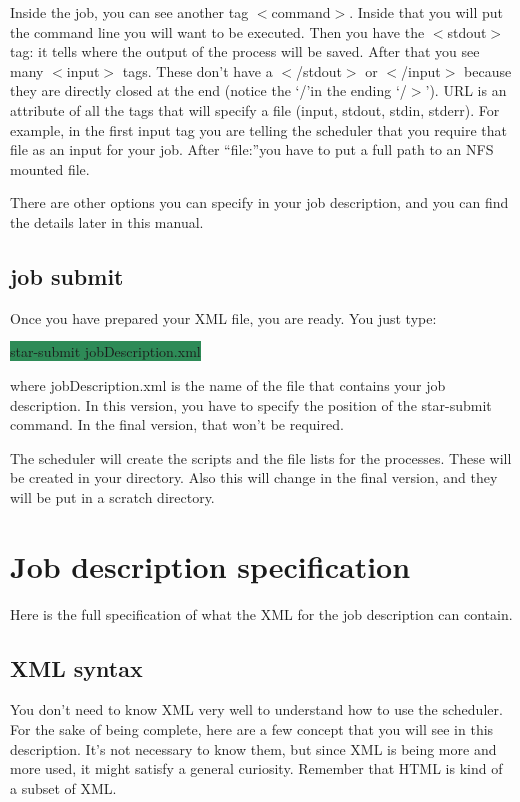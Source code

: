 Inside the job, you can see another tag $<$command$>$.
Inside that you will put the command line you will want to be executed.
Then you have the $<$stdout$>$ tag:
it tells where the output of the process will be saved.
After that you see many $<$input$>$ tags.
These don't have a $<$/stdout$>$ or $<$/input$>$ because they are directly closed at the end (notice the \textquoteleft{/}\textquoteright in the ending \textquoteleft{/}$>$\textquoteright).
URL is an attribute of all the tags that will specify a file (input, stdout, stdin, stderr).
For example,
in the first input tag you are telling the scheduler that you require that file as an input for your job.
After \textquotedblleft{file:}\textquotedblright you have to put a full path to an NFS mounted file.

There are other options you can specify in your job description,
and you can find the details later in this manual.

\subsection{job submit}
Once you have prepared your XML file, you are ready. You just type:
\begin{center}
  \colorbox{seagreen}{star-submit jobDescription.xml}
\end{center}
where jobDescription.xml is the name of the file that contains your job description.
In this version,
you have to specify the position of the star-submit command.
In the final version, that won't be required.

The scheduler will create the scripts and the file lists for the processes.
These will be created in your directory.
Also this will change in the final version,
and they will be put in a scratch directory.

\section{Job description specification}
Here is the full specification of what the XML for the job description can contain.

\subsection{XML syntax}
You don't need to know XML very well to understand how to use the scheduler.
For the sake of being complete,
here are a few concept that you will see in this description.
It's not necessary to know them, but since XML is being more and more used,
it might satisfy a general curiosity.
Remember that HTML is kind of a subset of XML.

